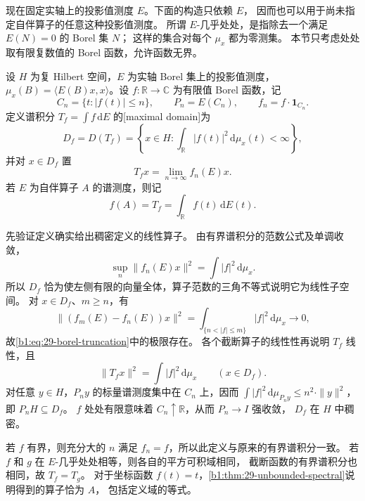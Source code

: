 现在固定实轴上的投影值测度 \(E\)。下面的构造只依赖 \(E\)，
因而也可以用于尚未指定自伴算子的任意这种投影值测度。
所谓 \(E\)-几乎处处，是指除去一个满足 \(E(N)=0\) 的 Borel 集 \(N\)；
这样的集合对每个 \(\mu_x\) 都为零测集。
本节只考虑处处取有限复数值的 Borel 函数，允许函数无界。

\begin{definition}[无界谱积分与最大定义域]
\label{b1:def:29-unbounded-calculus}
设 \(H\) 为复 Hilbert 空间，\(E\) 为实轴 Borel 集上的投影值测度，
\(\mu_x(B)=\langle E(B)x,x\rangle\)。设 \(f:\mathbb R\to\mathbb C\) 为有限值 Borel 函数，记
\[
 C_n=\{t:|f(t)|\le n\},\qquad P_n=E(C_n),\qquad
 f_n=f\cdot\mathbf1_{C_n}.
\]
定义谱积分 \(T_f=\int f\,\mathrm dE\) 的[maximal domain]为
\begin{equation}\label{b1:eq:29-borel-maximal-domain}
 D_f=D(T_f)=\left\{x\in H:\int_{\mathbb R}|f(t)|^2\,\mathrm d\mu_x(t)<\infty\right\},
\end{equation}
并对 \(x\in D_f\) 置
\begin{equation}\label{b1:eq:29-borel-truncation}
 T_fx=\lim_{n\to\infty}f_n(E)x.
\end{equation}
若 \(E\) 为自伴算子 \(A\) 的谱测度，则记
\[
 f(A)=T_f=\int_{\mathbb R}f(t)\,\mathrm dE(t).
\]
\end{definition}

先验证定义确实给出稠密定义的线性算子。
由有界谱积分的范数公式及单调收敛，
\begin{equation}\label{b1:eq:29-borel-domain-test}
 \sup_n\|f_n(E)x\|^2=\int|f|^2\,\mathrm d\mu_x.
\end{equation}
所以 \(D_f\) 恰为使左侧有限的向量全体，算子范数的三角不等式说明它为线性子空间。
对 \(x\in D_f\)、\(m\ge n\)，有
\[
 \|(f_m(E)-f_n(E))x\|^2
 =\int_{\{n<|f|\le m\}}|f|^2\,\mathrm d\mu_x\longrightarrow0,
\]
故\eqref{b1:eq:29-borel-truncation}中的极限存在。
各个截断算子的线性性再说明 \(T_f\) 线性，且
\begin{equation}\label{b1:eq:29-borel-norm}
 \|T_fx\|^2=\int|f|^2\,\mathrm d\mu_x\qquad(x\in D_f).
\end{equation}
对任意 \(y\in H\)，\(P_ny\) 的标量谱测度集中在 \(C_n\) 上，因而
\(\int|f|^2\,\mathrm d\mu_{P_ny}\le n^2\cdot\|y\|^2\)，即 \(P_nH\subseteq D_f\)。
\(f\) 处处有限意味着 \(C_n\uparrow\mathbb R\)，从而 \(P_n\to I\) 强收敛，
\(D_f\) 在 \(H\) 中稠密。

若 \(f\) 有界，则充分大的 \(n\) 满足 \(f_n=f\)，所以此定义与原来的有界谱积分一致。
若 \(f\) 和 \(g\) 在 \(E\)-几乎处处相等，则各自的平方可积域相同，
截断函数的有界谱积分也相同，故 \(T_f=T_g\)。
对于坐标函数 \(f(t)=t\)，\cref{b1:thm:29-unbounded-spectral}说明得到的算子恰为 \(A\)，
包括定义域的等式。

